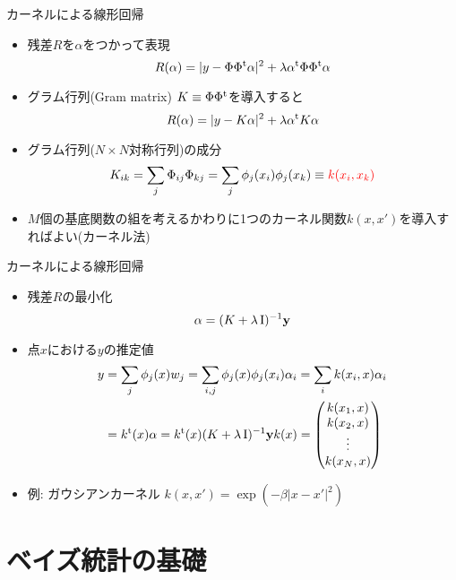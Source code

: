 \documentclass[dvipdfmx]{beamer}
\begin{document}
\begin{frame}[t,fragile]{カーネルによる線形回帰}
  \begin{itemize}
    \setlength{\itemsep}{1em}
  \item 残差$R$を$\alpha$をつかって表現
    \[
    R(\alpha) = | y - \Phi \Phi^{\rm t} \alpha |^2 + \lambda \alpha^{\rm t} \Phi \Phi^{\rm t} \alpha
    \]
  \item グラム行列(Gram matrix) $K \equiv \Phi \Phi^{\rm t}$を導入すると
    \[
    R(\alpha) = | y - K \alpha |^2 + \lambda \alpha^{\rm t} K \alpha
    \]
  \item グラム行列($N \times N$対称行列)の成分
    \[
    K_{ik} = \sum_j \Phi_{ij} \Phi_{kj} = \sum_j \phi_j(x_i) \phi_j(x_k) \equiv {\color{red} k(x_i,x_k)}
    \]
  \item $M$個の基底関数の組を考えるかわりに1つのカーネル関数$k(x,x')$を導入すればよい(カーネル法)
  \end{itemize}
\end{frame}

\begin{frame}[t,fragile]{カーネルによる線形回帰}
  \begin{itemize}
    \setlength{\itemsep}{1em}
  \item 残差$R$の最小化
    \[
    \alpha = (K + \lambda \, {\rm I})^{-1} {\bf y}
    \]
  \item 点$x$における$y$の推定値
    \begin{align*}
    y &= \sum_j \phi_j(x) w_j = \sum_{i,j} \phi_j(x) \phi_j(x_i) \alpha_i = \sum_i k(x_i,x) \alpha_i \\ &= k^{\rm t}(x) \alpha = k^{\rm t}(x) (K + \lambda \, {\rm I})^{-1} {\bf y}
k(x) = \begin{pmatrix} k(x_1,x) \\ k(x_2,x) \\ \vdots \\ k(x_N,x) \end{pmatrix}
    \end{align*}
  \item 例: ガウシアンカーネル $k(x,x') = \exp(-\beta|x-x'|^2)$
  \end{itemize}
\end{frame}

\section{ベイズ統計の基礎}
\end{document}
